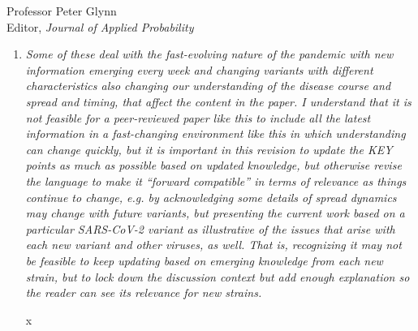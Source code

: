 \documentclass[11pt]{letter} %
\begin{document}
\begin{letter}{Professor
	Peter Glynn\\
	Editor, {\em Journal of Applied Probability}}
\begin{enumerate}
\vspace{5mm}
We thank the editor-in-chief as this is an excellent point.  We now acknowledge that both topics are well known and cite relevant literature in Section 1.1; however, while infectious disease researchers and survey statisticians have been aware of the perils of self-selection and measurement error, the interplay in this context has been less well studied.   By extending the statistical decomposition of Meng (2018), we help shed light on how measurement error does not act to simply alter the magnitude of error but may in fact change the sign as well.  This decomposition motivates the new inverse-probability and doubly robust methodologies in the revised manuscript.
\vspace{5mm}

\item {\it Some of these deal with the fast-evolving nature of the pandemic with new information emerging every week and changing variants with different characteristics also changing our understanding of the disease course and spread and timing, that affect the content in the paper. I understand that it is not feasible for a peer-reviewed paper like this to include all the latest information in a fast-changing environment like this in which understanding can change quickly, but it is important in this revision to update the KEY points as much as possible based on updated knowledge, but otherwise revise the language to make it “forward compatible” in terms of relevance as things continue to change, e.g. by acknowledging some details of spread dynamics may change with future variants, but presenting the current work based on a particular SARS-CoV-2 variant as illustrative of the issues that arise with each new variant and other viruses, as well. That is, recognizing it may not be feasible to keep updating based on emerging knowledge from each new strain, but to lock down the discussion context but add enough explanation so the reader can see its relevance for new strains.}

\vspace{5mm}
x
\vspace{5mm}


\end{enumerate}
\end{letter}
\end{document}
